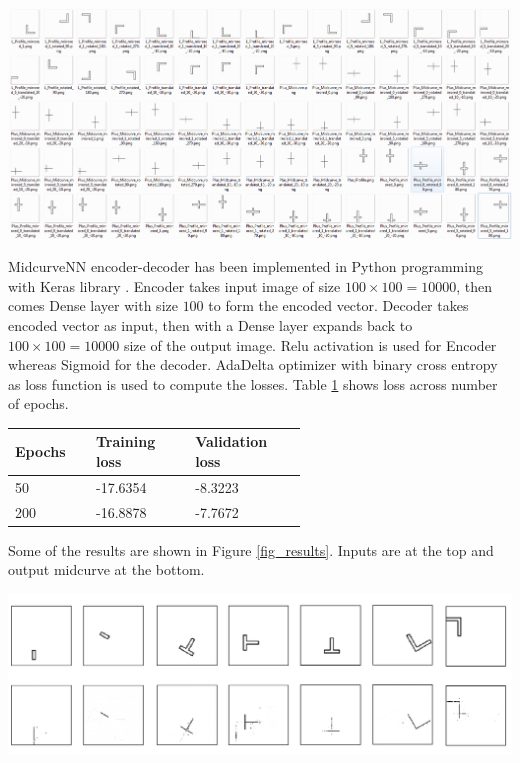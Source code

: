 \documentclass[9pt,academicons]{article}
\begin{document}
     \begin{center}
	\includegraphics[width=\linewidth]{images/training_data}
	\label{fig_training}
    \end{center}
    
MidcurveNN encoder-decoder has been implemented in Python programming with Keras library \cite{autoenkeras}.  Encoder takes input image of size $100 \times 100 = 10000$, then comes Dense layer with size $100$ to form the encoded vector. Decoder takes encoded vector as input, then with a Dense layer expands back to $100 \times 100 = 10000$ size of the output image. Relu activation is used for Encoder whereas Sigmoid for the decoder. AdaDelta optimizer with binary cross entropy as loss function is used to compute the losses. Table \ref{tbl_loss} shows loss across number of epochs.    


\begin{table}
\centering

\begin{tabular}[htbp]{@{} p{0.14\linewidth}  p{0.22\linewidth}  p{0.22\linewidth}  @{}} \toprule
{\bf Epochs } & {\bf Training loss }  & {\bf Validation loss} \\
\midrule
50	& -17.6354	& -8.3223\\
200	& -16.8878	& -7.7672 \\
\bottomrule
\end{tabular}
\label{tbl_loss}
\end{table}


Some of the results are shown in Figure \ref{fig_results}. Inputs are at the top and output midcurve at the bottom.

     \begin{center}
	\includegraphics[width=\linewidth]{images/midcurvenn_results}
	\label{fig_results}
    \end{center}
\end{document}
